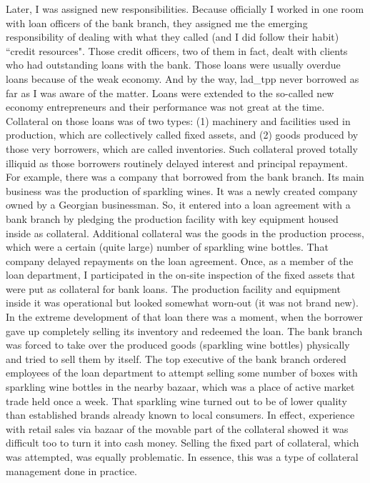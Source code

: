 Later, I was assigned new responsibilities. Because officially I worked in one room with loan officers of the bank branch, they assigned me the emerging responsibility of dealing with what they called (and I did follow their habit) ``credit resources". Those credit officers, two of them in fact, dealt with clients who had outstanding loans with the bank. Those loans were usually overdue loans because of the weak economy. And by the way, \ac{lad_tpp} never borrowed as far as I was aware of the matter. Loans were extended to the so-called new economy entrepreneurs and their performance was not great at the time. Collateral on those loans was of two types: (1) machinery and facilities used in production, which are collectively called fixed assets, and (2) goods produced by those very borrowers, which are called inventories. Such collateral proved totally illiquid as those borrowers routinely delayed interest and principal repayment. For example, there was a company that borrowed from the bank branch. Its main business was the production of sparkling wines. It was a newly created company owned by a Georgian businessman. So, it entered into a loan agreement with a bank branch by pledging the production facility with key equipment housed inside as collateral. Additional collateral was the goods in the production process, which were a certain (quite large) number of sparkling wine bottles. That company delayed repayments on the loan agreement. Once, as a member of the loan department, I participated in the on-site inspection of the fixed assets that were put as collateral for bank loans. The production facility and equipment inside it was operational but looked somewhat worn-out (it was not brand new). In the extreme development of that loan there was a moment, when the borrower gave up completely selling its inventory and redeemed the loan. The bank branch was forced to take over the produced goods (sparkling wine bottles) physically and tried to sell them by itself. The top executive of the bank branch ordered employees of the loan department to attempt selling some number of boxes with sparkling wine bottles in the nearby bazaar, which was a place of active market trade held once a week. That sparkling wine turned out to be of lower quality than established brands already known to local consumers. In effect, experience with retail sales via bazaar of the movable part of the collateral showed it was difficult too to turn it into cash money. Selling the fixed part of collateral, which was attempted, was equally problematic. In essence, this was a type of collateral management done in practice.

